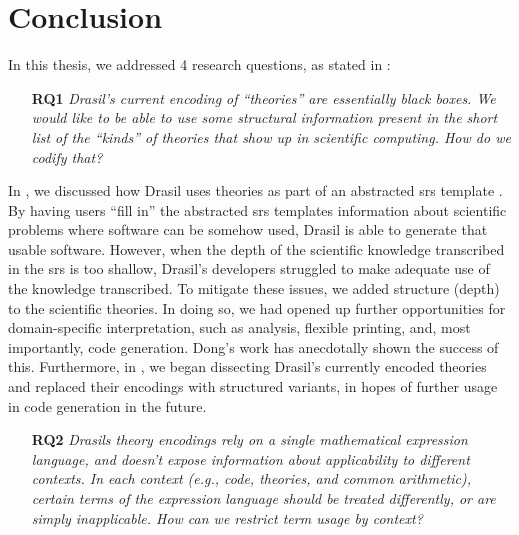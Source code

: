\chapter{Conclusion}
\label{chap:conclusion}

In this thesis, we addressed 4 research questions, as stated in
:

\begin{enumerate}

    \item[\textbf{RQ1}] \textit{Drasil's current encoding of ``theories'' are
          essentially black boxes. We would like to be able to use some
          structural information present in the short list of the ``kinds'' of
          theories that show up in scientific computing. How do we codify that?}

\end{enumerate}

In , we discussed how Drasil uses theories as part of an
abstracted \acs{srs} template \cite{SmithAndLai2005}. By having users ``fill
in'' the abstracted \acs{srs} templates information about scientific problems
where software can be somehow used, Drasil is able to generate that usable
software. However, when the depth of the scientific knowledge transcribed in the
\acs{srs} is too shallow, Drasil's developers struggled to make adequate use of
the knowledge transcribed. To mitigate these issues, we added structure (depth)
to the scientific theories. In doing so, we had opened up further opportunities
for domain-specific interpretation, such as analysis, flexible printing, and,
most importantly, code generation. Dong's work \cite{Chen2022MEng} has
anecdotally shown the success of this. Furthermore, in
, we began dissecting Drasil's currently encoded
theories and replaced their encodings with structured variants, in hopes of
further usage in code generation in the future.

\begin{enumerate}
    
    \item[\textbf{RQ2}] \textit{Drasils theory encodings rely on a single
          mathematical expression language, and doesn't expose information about
          applicability to different contexts. In each context (e.g., code,
          theories, and common arithmetic), certain terms of the expression
          language should be treated differently, or are simply inapplicable.
          How can we restrict term usage by context?}

\end{enumerate}

